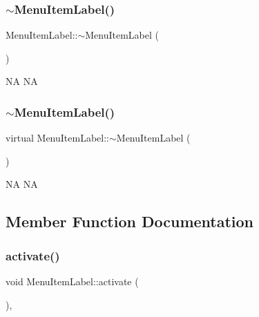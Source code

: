 \subsubsection{\texorpdfstring{$\sim$\+Menu\+Item\+Label()}{~MenuItemLabel()}\hspace{0.1cm}{\footnotesize\ttfamily [1/2]}}
{\footnotesize\ttfamily Menu\+Item\+Label\+::$\sim$\+Menu\+Item\+Label (\begin{DoxyParamCaption}{ }\end{DoxyParamCaption})\hspace{0.3cm}{\ttfamily [virtual]}}

NA  NA \mbox{\label{classMenuItemLabel_af53a26705e5d33292ce79ba1c95c9c04}} 
\subsubsection{\texorpdfstring{$\sim$\+Menu\+Item\+Label()}{~MenuItemLabel()}\hspace{0.1cm}{\footnotesize\ttfamily [2/2]}}
{\footnotesize\ttfamily virtual Menu\+Item\+Label\+::$\sim$\+Menu\+Item\+Label (\begin{DoxyParamCaption}{ }\end{DoxyParamCaption})\hspace{0.3cm}{\ttfamily [virtual]}}

NA  NA 

\subsection{Member Function Documentation}
\mbox{\label{classMenuItemLabel_a03b829211e9bf837d6e2febc1bee290c}} 
\subsubsection{\texorpdfstring{activate()}{activate()}\hspace{0.1cm}{\footnotesize\ttfamily [1/2]}}
{\footnotesize\ttfamily void Menu\+Item\+Label\+::activate (\begin{DoxyParamCaption}{ }\end{DoxyParamCaption})\hspace{0.3cm}{\ttfamily [override]}, {\ttfamily [virtual]}}

